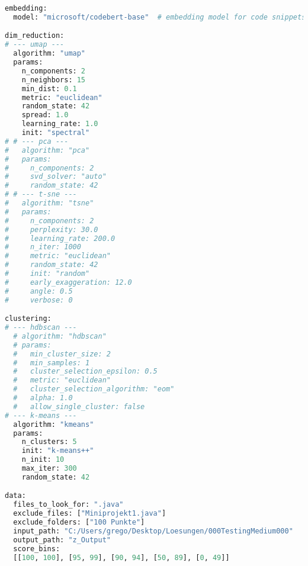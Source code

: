 \begin{lstlisting}[language=Python, caption={Konfigurationsdatei}, label={prco:Konfigurationsdatei}]
embedding:
  model: "microsoft/codebert-base"  # embedding model for code snippets

dim_reduction:
# --- umap ---
  algorithm: "umap"
  params:
    n_components: 2
    n_neighbors: 15
    min_dist: 0.1
    metric: "euclidean"
    random_state: 42
    spread: 1.0
    learning_rate: 1.0
    init: "spectral"
# # --- pca ---
#   algorithm: "pca"
#   params:
#     n_components: 2
#     svd_solver: "auto"
#     random_state: 42
# # --- t-sne ---
#   algorithm: "tsne"
#   params:
#     n_components: 2
#     perplexity: 30.0
#     learning_rate: 200.0
#     n_iter: 1000
#     metric: "euclidean"
#     random_state: 42
#     init: "random"
#     early_exaggeration: 12.0
#     angle: 0.5
#     verbose: 0

clustering:
# --- hdbscan ---
  # algorithm: "hdbscan"
  # params:
  #   min_cluster_size: 2
  #   min_samples: 1
  #   cluster_selection_epsilon: 0.5
  #   metric: "euclidean"
  #   cluster_selection_algorithm: "eom"
  #   alpha: 1.0
  #   allow_single_cluster: false
# --- k-means ---
  algorithm: "kmeans"
  params:
    n_clusters: 5
    init: "k-means++"
    n_init: 10
    max_iter: 300
    random_state: 42

data:
  files_to_look_for: ".java"
  exclude_files: ["Miniprojekt1.java"]
  exclude_folders: ["100 Punkte"]
  input_path: "C:/Users/grego/Desktop/Loesungen/000TestingMedium000"
  output_path: "z_Output"
  score_bins:
  [[100, 100], [95, 99], [90, 94], [50, 89], [0, 49]]
\end{lstlisting}


